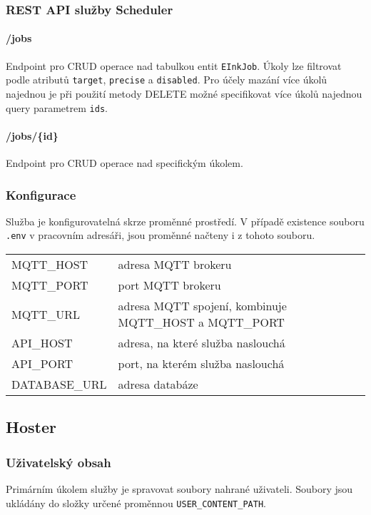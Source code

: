 \subsubsection{REST API služby Scheduler}
\paragraph*{/jobs} Endpoint pro CRUD operace nad tabulkou entit \lstinline{EInkJob}. Úkoly lze filtrovat podle atributů \lstinline{target}, \lstinline{precise} a \lstinline{disabled}. Pro účely mazání více úkolů najednou je při použití metody DELETE možné specifikovat více úkolů najednou query parametrem \lstinline{ids}.
\paragraph*{/jobs/\{id\}} Endpoint pro CRUD operace nad specifickým úkolem.

\subsubsection{Konfigurace}
Služba je konfigurovatelná skrze proměnné prostředí. V případě existence souboru \lstinline|.env| v pracovním adresáři, jsou proměnné načteny i z tohoto souboru.

\begin{table}[h]
    \begin{tabular}{ll}
        MQTT\_HOST & adresa MQTT brokeru \\
        MQTT\_PORT & port MQTT brokeru \\
        MQTT\_URL & adresa MQTT spojení, kombinuje MQTT\_HOST a MQTT\_PORT \\
        API\_HOST & adresa, na které služba naslouchá \\
        API\_PORT & port, na kterém služba naslouchá \\
        DATABASE\_URL & adresa databáze \\
    \end{tabular}
\end{table}

\subsection{Hoster}
\subsubsection{Uživatelský obsah}
Primárním úkolem služby je spravovat soubory nahrané uživateli. Soubory jsou ukládány do složky určené proměnnou \lstinline{USER_CONTENT_PATH}.

